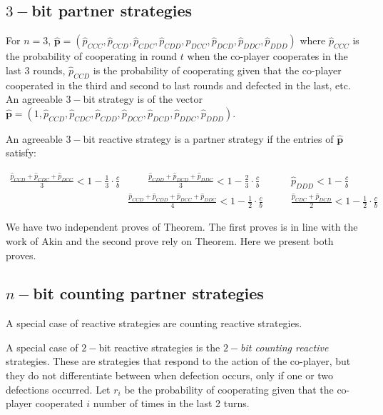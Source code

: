 \documentclass{article}
\theoremstyle{definition}
\begin{document}
\subsection{$3-$bit partner strategies}

For $n=3$, $\mathbf{\hat{p}}=(\hat{p}_{CCC}, \hat{p}_{CCD}, \hat{p}_{CDC},
\hat{p}_{CDD}, \hat{p}_{DCC}, \hat{p}_{DCD}, \hat{p}_{DDC}, \hat{p}_{DDD})$
where $\hat{p}_{CCC}$ is the probability of cooperating in round $t$ when the
co-player cooperates in the last 3 rounds, $\hat{p}_{CCD}$ is the probability of
cooperating given that the co-player cooperated in the third and second to last
rounds and defected in the last, etc. An agreeable $3-$bit strategy is of the
vector $\mathbf{\hat{p}}=(1, \hat{p}_{CCD}, \hat{p}_{CDC}, \hat{p}_{CDD},
\hat{p}_{DCC}, \hat{p}_{DCD}, \hat{p}_{DDC}, \hat{p}_{DDD})$.

An agreeable $3-$bit reactive strategy is a partner strategy if the entries of
$\mathbf{\hat{p}}$ satisfy:

\begin{align}\label{eq:three_bit_conditions}
  \frac{\hat{p}_{CCD} + \hat{p}_{CDC} + \hat{p}_{DCC}}{3} < 1\!-\! \frac{1}{3} \cdot \frac{c}{b} & \qquad 
  \frac{\hat{p}_{CDD} + \hat{p}_{DCD} + \hat{p}_{DDC}}{3} < 1\!-\! \frac{2}{3} \cdot \frac{c}{b} & \qquad 
  \hat{p}_{DDD} < 1\!-\! \frac{c}{b} \\
  & \frac{\hat{p}_{CCD} + \hat{p}_{CDD} + \hat{p}_{DCC} + \hat{p}_{DDC}}{4}  < 1\!-\! \frac{1}{2} \cdot \frac{c}{b} 
  & \qquad \frac{\hat{p}_{CDC} + \hat{p}_{DCD}}{2} < 1\!-\! \frac{1}{2} \cdot \frac{c}{b}
\end{align}

We have two independent proves of Theorem. The first proves is in line with the
work of Akin and the second prove rely on Theorem. Here we present both proves.


\subsection{$n-$bit counting partner strategies}

A special case of reactive strategies are counting reactive strategies.

A special case of $2-$bit reactive strategies is the {\it $2-$bit counting
reactive} strategies. These are strategies that respond to the action of the
co-player, but they do not differentiate between when defection occurs, only if
one or two defections occurred. Let \(r_i\) be the probability of cooperating
given that the co-player cooperated \(i\) number of times in the last 2 turns.
\end{document}
